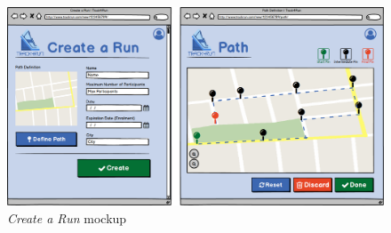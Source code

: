 \begin{figure}[H]
\begin{center}
  \includegraphics[width=\textwidth]{img/mockup/CreateRun.png}
  \hspace{0.05\linewidth}
  \centering
  \caption{\textit{Create a Run} mockup}
  \label{img:createRunMockup}
\end{center}
\end{figure}
